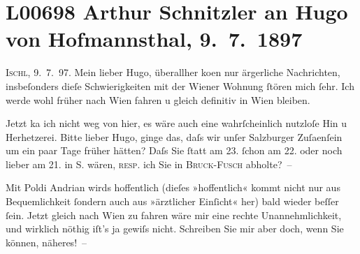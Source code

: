 

\section[Arthur Schnitzler an Hugo von Hofmannsthal, 9. 7. 1897]{L00698 Arthur Schnitzler an Hugo von Hofmannsthal, 9. 7. 1897}
\nopagebreak{}
\rehead{ }\normalsize\beginnumbering{}
\toendnotes[C]{\smallbreak\pagebreak[2]}
\pstart
           \raggedleft{}{\pb}\textsc{Ischl}, 9. 7. 97.\pend
           \vspace{0.5em}
\pstart
           Mein lieber Hugo, überallher ko{\geminationm}en nur
               ärgerliche Nachrichten, insbeſonders dieſe Schwierigkeiten mit der Wiener Wohnung ſtören mich ſehr. Ich werde wohl früher nach Wien fahren u gleich definitiv in Wien bleiben.\pend
           
\pstart
           Jetzt ka{\geminationn} ich nicht weg von hier, es wäre auch eine
               wahrſcheinlich nutzloſe Hin u Herhetzerei. {\pb}Bitte lieber
               Hugo, ginge das, daſs wir unſer Salzburger Zuſa{\geminationm}enſein um ein paar Tage früher hätten? Daſs Sie ſtatt
               am 23.{ }ſchon am 22. oder noch lieber am
                  21. in S. wären, \textsc{resp.} ich Sie in \textsc{Bruck}-\textsc{Fusch} abholte? –\pend
           
\pstart
           Mit Poldi Andrian wirds hoffentlich (dieſes
               »hoffentlich« kommt nicht nur aus Bequemlichkeit ſondern auch aus »ärztlicher
               Einſicht« her) bald {\pb}wieder beſſer ſein. Jetzt gleich nach
                  Wien zu fahren wäre mir eine rechte
               Unannehmlichkeit, und wirklich nöthig iſt’s ja gewiſs nicht. Schreiben Sie mir aber
               doch, wenn Sie können, näheres! –\pend
           
